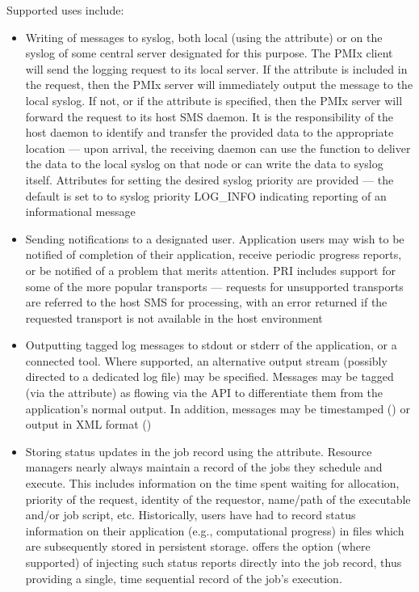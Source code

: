 \par
Supported uses include:

\begin{itemize}
\item Writing of messages to syslog, both local (using the  attribute) or on the syslog of some central server designated for this purpose. The \ac{PMIx} client will send the logging request to its local server. If the  attribute is included in the request, then the \ac{PMIx} server will immediately output the message to the local syslog. If not, or if the  attribute is specified, then the \ac{PMIx} server will forward the request to its host \ac{SMS} daemon. It is the responsibility of the host daemon to identify and transfer the provided data to the appropriate location --- upon arrival, the receiving daemon can use the  function to deliver the data to the local syslog on that node or can write the data to syslog itself. Attributes for setting the desired syslog priority are provided --- the default is set to to syslog priority LOG_INFO indicating reporting of an informational message

\item Sending notifications to a designated user. Application users may wish to be notified of completion of their application, receive periodic progress reports, or be notified of a problem that merits attention. \ac{PRI} includes support for some of the more popular transports --- requests for unsupported transports are referred to the host \ac{SMS} for processing, with an error returned if the requested transport is not available in the host environment

\item Outputting tagged log messages to stdout or stderr of the application, or a connected tool. Where supported, an alternative output stream (possibly directed to a dedicated log file) may be specified. Messages may be tagged (via the  attribute) as flowing via the  \ac{API} to differentiate them from the application's normal output. In addition, messages may be timestamped () or output in \ac{XML} format ()

\item Storing status updates in the job record using the  attribute. Resource managers nearly always maintain a record of the jobs they schedule and execute. This includes information on the time spent waiting for allocation, priority of the request, identity of the requestor, name/path of the executable and/or job script, etc. Historically, users have had to record status information on their application (e.g., computational progress) in files which are subsequently stored in persistent storage.  offers the option (where supported) of injecting such status reports directly into the job record, thus providing a single, time sequential record of the job's execution.


\end{itemize}
